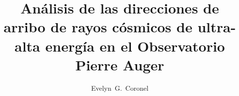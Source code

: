 \documentclass[12pt,papel,oneside]{ibtesis}
\title{Análisis de las direcciones de arribo de rayos cósmicos de ultra-alta energía en el Observatorio Pierre Auger}
\author{Evelyn~G.~Coronel}
\begin{document}






\begin{biblio}
	
\end{biblio}
    
    
\end{document}
